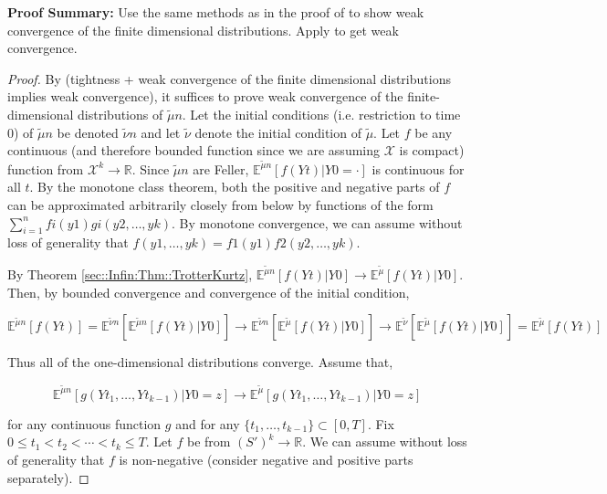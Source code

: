\documentclass[12pt]{article}
\newcommand{\mb}{\mathbb}
\newcommand{\mc}{\mathcal}
\newcommand{\ra}{\rightarrow}
\newcommand{\pfsum}{\textbf{Proof Summary: }}
\newcommand{\ind}{\hspace{24pt}}
\newcommand{\exmu}[2]{\mb{E}^{#1}\left[#2\right]}	%
\renewcommand{\t}{t}							%
\newcommand{\alt}[1]{\widetilde{#1}}			%
\newcommand{\indx}[1]{_{#1}}					%
\newcommand{\m}{\mu}							%
\newcommand{\mm}{\nu}							%
\newcommand{\XX}{Y}								%
\renewcommand{\it}{k}							%
\newcommand{\spce}{\mc{X}}						%
\newcommand{\xx}{y}								%
\newcommand{\xxx}{z}							%
\begin{document}
\pfsum Use the same methods as in the proof of \cite[Theorem 4.2]{Kur81} to show weak convergence of the finite dimensional distributions. Apply \cite[Theorem 13.1]{Bil99} to get weak convergence.

\begin{proof}
By \cite[Theorem 13.1]{Bil99} (tightness + weak convergence of the finite dimensional distributions implies weak convergence), it suffices to prove weak convergence of the finite-dimensional distributions of \(\alt{\m}{n}\). Let the initial conditions (i.e. restriction to time 0) of \(\alt{\m}{n}\) be denoted \(\alt{\mm}{n}\) and let \(\alt{\mm}\) denote the initial condition of \(\alt{\m}\). Let \(f\) be any continuous (and therefore bounded function since we are assuming \(\spce\) is compact) function from \(\spce^k\ra\mb{R}\). Since \(\alt{\m}{n}\) are Feller, \(\exmu{\alt{\m}{n}}{f(\XX{}{\t})|\XX{}{0} = \cdot}\) is continuous for all \(\t\). By the monotone class theorem, both the positive and negative parts of \(f\) can be approximated arbitrarily closely from below by functions of the form \(\sum_{i=1}^n f{i}(\xx{1})g{i}(\xx{2},\dots,\xx{\it})\). By monotone convergence, we can assume without loss of generality that \(f(\xx{1},\dots,\xx{\it}) = f{1}(\xx{1})f{2}(\xx{2},\dots,\xx{\it})\).

\ind By Theorem \ref{sec::Infin:Thm::TrotterKurtz}, \(\exmu{\alt{\m}{n}}{f(\XX{}{\t})|\XX{}{0}} \ra \exmu{\alt{\m}}{f(\XX{}{\t})|\XX{}{0}}\). Then, by bounded convergence and convergence of the initial condition,

\[\exmu{\alt{\m}{n}}{f(\XX{}{\t})}  = \exmu{\alt{\mm}{n}}{\exmu{\alt{\m}{n}}{f(\XX{}{\t})|\XX{}{0}}} \ra \exmu{\alt{\mm}{n}}{\exmu{\alt{\m}}{f(\XX{}{\t})|\XX{}{0}}} \ra \exmu{\alt{\mm}}{\exmu{\alt{\m}}{f(\XX{}{\t})|\XX{}{0}}} = \exmu{\alt{\m}}{f(\XX{}{\t})}\]

Thus all of the one-dimensional distributions converge. Assume that,

\[\exmu{\alt{\m}{n}}{g(\XX{}{\t\indx{1}},\dots,\XX{}{\t\indx{k-1}})|\XX{}{0}=\xxx} \ra \exmu{\alt{\m}}{g(\XX{}{\t\indx{1}},\dots,\XX{}{\t\indx{k-1}})|\XX{}{0}=\xxx}\]

\noindent for any continuous function \(g\) and for any \(\{\t\indx{1},\dots,\t\indx{k-1}\} \subset [0,T]\). Fix \(0\leq \t\indx{1} <\t\indx{2} <\cdots < \t\indx{\it}\leq T\). Let \(f\) be from \((S')^k \ra \mb{R}\). We can assume without loss of generality that \(f\) is non-negative (consider negative and positive parts separately).


\end{proof}
\end{document}
